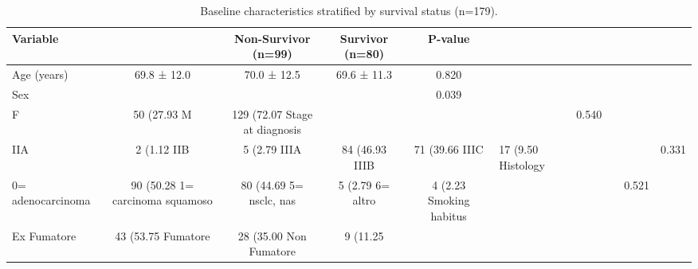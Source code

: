 \begin{table}[!ht]
\centering
\small
\caption{Baseline characteristics stratified by survival status (n=179).}
\begin{tabular}{lcccc}
\toprule
Variable & & Non-Survivor (n=99) & Survivor (n=80) & P-value \\
\midrule
Age (years) & 69.8 ± 12.0 & 70.0 ± 12.5 & 69.6 ± 11.3 & 0.820 \\
Sex & & & & 0.039 \\
\hspace{3mm} F & 50 (27.93%
\hspace{3mm} M & 129 (72.07%
Stage at diagnosis & & & & 0.540 \\
\hspace{3mm} IIA & 2 (1.12%
\hspace{3mm} IIB & 5 (2.79%
\hspace{3mm} IIIA & 84 (46.93%
\hspace{3mm} IIIB & 71 (39.66%
\hspace{3mm} IIIC & 17 (9.50%
Histology & & & & 0.331 \\
\hspace{3mm} 0= adenocarcinoma & 90 (50.28%
\hspace{3mm} 1= carcinoma squamoso & 80 (44.69%
\hspace{3mm} 5= nsclc, nas & 5 (2.79%
\hspace{3mm} 6= altro & 4 (2.23%
Smoking habitus & & & & 0.521 \\
\hspace{3mm} Ex Fumatore & 43 (53.75%
\hspace{3mm} Fumatore & 28 (35.00%
\hspace{3mm} Non Fumatore & 9 (11.25%

\end{tabular}
\end{table}
